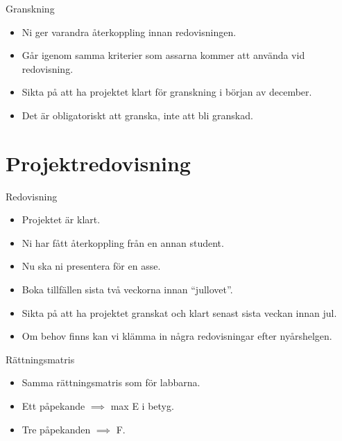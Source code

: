 \begin{frame}
  \begin{block}{Granskning}
    \begin{itemize}
      \item Ni ger varandra återkoppling innan redovisningen.
      \item Går igenom samma kriterier som assarna kommer att använda vid 
        redovisning.
      \item \alert{Sikta på att ha projektet klart för granskning i början av 
        december.}
      \end{itemize}
  \end{block}

  \pause

  \begin{remark}
    \begin{itemize}
      \item Det är obligatoriskt att granska, inte att bli granskad.
    \end{itemize}
  \end{remark}
\end{frame}


\section{Projektredovisning}

\begin{frame}
  \begin{block}{Redovisning}
    \begin{itemize}
      \item Projektet är klart.
      \item Ni har fått återkoppling från en annan student.
      \item Nu ska ni presentera för en asse.
      \item Boka tillfällen sista två veckorna innan \enquote{jullovet}. \item 
        \alert{Sikta på att ha projektet granskat och klart senast sista veckan 
        innan jul.}
    \end{itemize}
  \end{block}

  \pause

  \begin{remark}
    \begin{itemize}
      \item Om behov finns kan vi klämma in några redovisningar efter 
        nyårshelgen.
    \end{itemize}
  \end{remark}
\end{frame}

\begin{frame}
  \begin{block}{Rättningsmatris}
    \begin{itemize}
      \item Samma rättningsmatris som för labbarna.
      \item Ett påpekande \(\implies\) max E i betyg.
      \item Tre påpekanden \(\implies\) F.
    \end{itemize}
  \end{block}
\end{frame}

